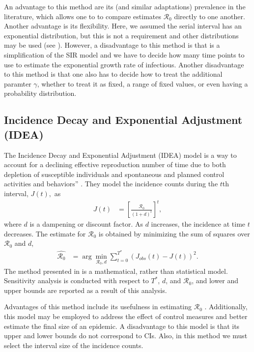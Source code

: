 \message{ !name(draft_v13.tex)}\documentclass[12pt]{article}
\newcommand{\rr}{\ensuremath{\mathcal{R}_0}}
\begin{document}
An advantage to this method are its (and similar adaptations) prevalence in the literature, which allows one to to compare estimates $\rr$ directly to one another.  Another advantage is its flexibility.  Here, we assumed the serial interval has an exponential distribution, but this is not a requirement and other distributions may be used (see \cite{wallinga2007generation}).  However, a disadvantage to this method is that is a simplification of the SIR model and we have to decide how many time points to use to estimate the exponential growth rate of infectious.  Another disadvantage to this method is that one also has to decide how to treat the additional paramter $\gamma$, whether to treat it as fixed, a range of fixed values, or even having a probability distribution.


\subsection{Incidence Decay and Exponential Adjustment (IDEA)}\label{sec:idea}
The Incidence Decay and Exponential Adjustment (IDEA) model is a way to account for a declining effective reproduction number of time due to both depletion of susceptible individuals and spontaneous and planned control activities and behaviors'' \citep{fisman2013}.  They model the incidence counts during the $t$th interval, $J(t),$ as
\begin{align*}
  J(t) &= \left [ \frac{\rr}{(1 + d)^t}\right ]^t,
\end{align*}
where $d$ is a dampening or discount factor.  As $d$ increases, the incidence at time $t$  decreases. The estimate for $\rr$ is obtained by minimizing the sum of squares over $\rr$ and $d$,
\begin{align*}
  \hat{\rr} &=  \arg \min_{\rr,d} \sum_{t=0}^{T^*}\left (J_{obs}(t) - J(t) \right)^2.
\end{align*}
The method presented in \cite{fisman2013} is a mathematical, rather than statistical model.  Sensitivity analysis is conducted with respect to $T^*$, $d$, and $\rr$, and lower and upper bounds are reported as a result of this analysis.

Advantages of this method include its usefulness in estimating $\rr$ \citep{fisman2014,majumder2016}.  Additionally, this model may be employed to address the effect of control measures and better estimate the final size of an epidemic.  A disadvantage to this model is that its upper and lower bounds do not correspond to CIs.  Also, in this method we must select the interval size of the incidence counts.
\end{document}
